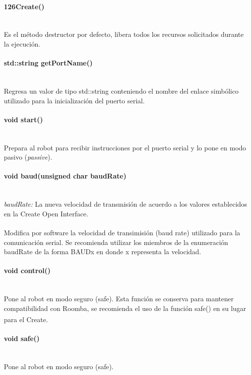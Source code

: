 \documentclass[letterpaper,openright,12pt]{book}
\begin{document}
\paragraph{\char126Create()}\mbox{}\\
Es el método destructor por defecto, libera todos los recursos solicitados durante la ejecución.\\

\paragraph{std::string getPortName()}\mbox{}\\
Regresa un valor de tipo std::string conteniendo el nombre del enlace simbólico utilizado para la inicialización del puerto serial.

\paragraph{void start()}\mbox{}\\
Prepara al robot para recibir instrucciones por el puerto serial y lo pone en modo pasivo (\emph{passive}).\\

\paragraph{void baud(unsigned char baudRate)}\mbox{}\\
\emph{baudRate: } La nueva velocidad de transmisión de acuerdo a los valores establecidos en la Create Open Interface.\\\\
Modifica por software la velocidad de transimisión (baud rate) utilizado para la comunicación serial.  Se recomienda utilizar los miembros de la enumeración baudRate de la forma BAUDx en donde x representa la velocidad.\\

\paragraph{void control()}\mbox{}\\
Pone al robot en modo seguro (safe). Esta función se conserva para mantener compatibilidad con Roomba, se recomienda el uso de la función safe() en su lugar para el Create\textsuperscript{\textregistered}.\\
		
\paragraph{void safe()}\mbox{}\\
Pone al robot en modo seguro (safe).\\
\end{document}
